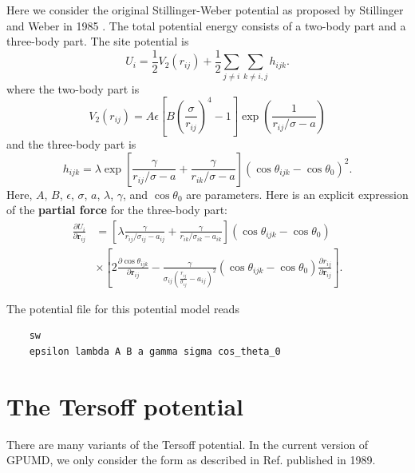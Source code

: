 \documentclass[12pt,a4paper]{report}
\newcommand{\vect}[1]{\boldsymbol{#1}}
\begin{document}
Here we consider the original Stillinger-Weber potential as proposed by Stillinger and Weber in 1985 \cite{stillinger1985prb}.
The total potential energy consists of a two-body part and a three-body part. The site potential is
\begin{equation}
U_i = \frac{1}{2} V_2(r_{ij}) + \frac{1}{2}\sum_{j\neq i}\sum_{k\neq i,j} h_{ijk}.
\end{equation}
where the two-body part is
\begin{equation}
V_2(r_{ij}) =  A \epsilon
\left[
  B \left( \frac{\sigma }{ r_{ij} } \right)^{4}-1
\right]
\exp\left(   \frac{1}{ r_{ij} / \sigma - a} \right)
\end{equation}
and the three-body part is
\begin{equation}
h_{ijk}=\lambda
\exp
\left[
\frac{\gamma}{r_{ij}/\sigma-a} + \frac{\gamma}{r_{ik}/\sigma-a}
\right]
         \left(\cos \theta_{ijk} - \cos \theta_{0} \right)^2.
\end{equation}
Here, $A$, $B$, $\epsilon$, $\sigma$, $a$, $\lambda$, $\gamma$, and $\cos \theta_{0}$ are parameters. Here is an explicit expression of the \textbf{partial force} for the three-body part:
\begin{align}
\frac{\partial U_i}{\partial \vect{r}_{ij}}
&= \left[
\lambda \frac{\gamma}{r_{ij}/\sigma_{ij}-a_{ij}} + \frac{\gamma}{r_{ik}/\sigma_{ik}-a_{ik}}
\right] \left(\cos \theta_{ijk} - \cos \theta_{0} \right) \nonumber \\
&\times
\left[
  2 \frac{\partial \cos \theta_{ijk}} {\partial \vect{r}_{ij}} -
  \frac{\gamma}{\sigma_{ij} \left( \frac{r_{ij}}{\sigma_{ij}} - a_{ij} \right)^2}
  \left(\cos \theta_{ijk} - \cos \theta_{0} \right)
  \frac{\partial r_{ij}} {\partial \vect{r}_{ij}}
\right].
\end{align}

The potential file for this potential model reads
\begin{verbatim}
    sw
    epsilon lambda A B a gamma sigma cos_theta_0
\end{verbatim}


\section{The Tersoff potential}

There are many variants of the Tersoff potential. In the current version of GPUMD, we only consider the form as described in Ref. \cite{tersoff1989prb} published in 1989.
\end{document}
